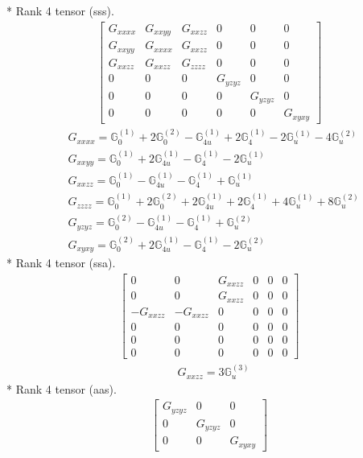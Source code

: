 \documentclass[fleqn,8pt,landscape]{jsarticle}
\begin{document}
* Rank 4 tensor (sss).
\begin{align*}
\begin{bmatrix} G_{xxxx} & G_{xxyy} & G_{xxzz} & 0 & 0 & 0 \\ G_{xxyy} & G_{xxxx} & G_{xxzz} & 0 & 0 & 0 \\ G_{xxzz} & G_{xxzz} & G_{zzzz} & 0 & 0 & 0 \\ 0 & 0 & 0 & G_{yzyz} & 0 & 0 \\ 0 & 0 & 0 & 0 & G_{yzyz} & 0 \\ 0 & 0 & 0 & 0 & 0 & G_{xyxy} \end{bmatrix}
\end{align*}
\begin{align*}
& G_{xxxx} = \mathbb{G}_{0}^{(1)} + 2 \mathbb{G}_{0}^{(2)} - \mathbb{G}_{4u}^{(1)} + 2 \mathbb{G}_{4}^{(1)} - 2 \mathbb{G}_{u}^{(1)} - 4 \mathbb{G}_{u}^{(2)} \\
& G_{xxyy} = \mathbb{G}_{0}^{(1)} + 2 \mathbb{G}_{4u}^{(1)} - \mathbb{G}_{4}^{(1)} - 2 \mathbb{G}_{u}^{(1)} \\
& G_{xxzz} = \mathbb{G}_{0}^{(1)} - \mathbb{G}_{4u}^{(1)} - \mathbb{G}_{4}^{(1)} + \mathbb{G}_{u}^{(1)} \\
& G_{zzzz} = \mathbb{G}_{0}^{(1)} + 2 \mathbb{G}_{0}^{(2)} + 2 \mathbb{G}_{4u}^{(1)} + 2 \mathbb{G}_{4}^{(1)} + 4 \mathbb{G}_{u}^{(1)} + 8 \mathbb{G}_{u}^{(2)} \\
& G_{yzyz} = \mathbb{G}_{0}^{(2)} - \mathbb{G}_{4u}^{(1)} - \mathbb{G}_{4}^{(1)} + \mathbb{G}_{u}^{(2)} \\
& G_{xyxy} = \mathbb{G}_{0}^{(2)} + 2 \mathbb{G}_{4u}^{(1)} - \mathbb{G}_{4}^{(1)} - 2 \mathbb{G}_{u}^{(2)}
\end{align*}
* Rank 4 tensor (ssa).
\begin{align*}
\begin{bmatrix} 0 & 0 & G_{xxzz} & 0 & 0 & 0 \\ 0 & 0 & G_{xxzz} & 0 & 0 & 0 \\ - G_{xxzz} & - G_{xxzz} & 0 & 0 & 0 & 0 \\ 0 & 0 & 0 & 0 & 0 & 0 \\ 0 & 0 & 0 & 0 & 0 & 0 \\ 0 & 0 & 0 & 0 & 0 & 0 \end{bmatrix}
\end{align*}
\begin{align*}
& G_{xxzz} = 3 \mathbb{G}_{u}^{(3)}
\end{align*}
* Rank 4 tensor (aas).
\begin{align*}
\begin{bmatrix} G_{yzyz} & 0 & 0 \\ 0 & G_{yzyz} & 0 \\ 0 & 0 & G_{xyxy} \end{bmatrix}
\end{align*}
\end{document}
